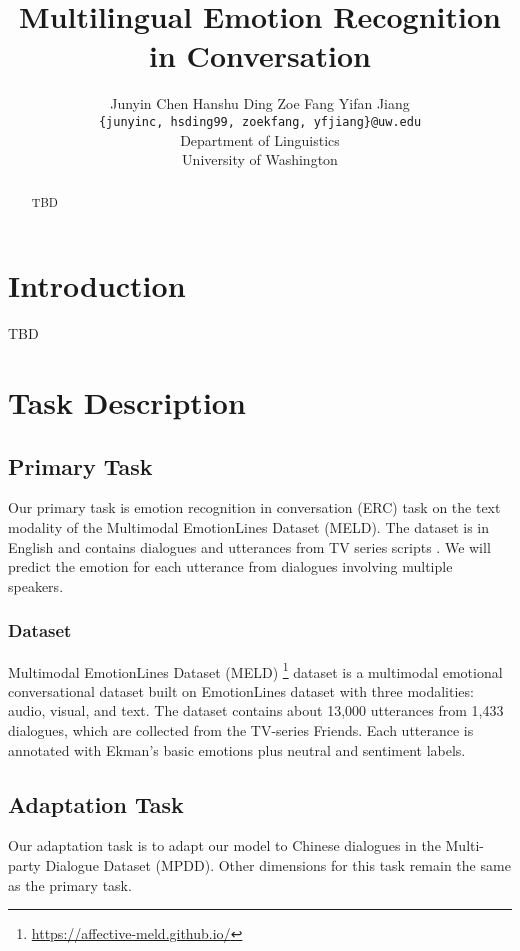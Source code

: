 \documentclass[11pt]{article}
\title{Multilingual Emotion Recognition in Conversation}
\author{Junyin Chen {} {} {} Hanshu Ding {} {} {} Zoe Fang {} {} {} Yifan Jiang \\
		\texttt{\{junyinc, hsding99, zoekfang, yfjiang\}@uw.edu} \\
        Department of Linguistics \\ University of Washington}
\begin{document}
\maketitle
\begin{abstract}
  TBD
\end{abstract}

\section{Introduction}
TBD

\section{Task Description}

\subsection{Primary Task}
\label{sect:primary_task}

Our primary task is emotion recognition in conversation (ERC) task on the text modality of the Multimodal EmotionLines Dataset (MELD). The dataset is in English and contains dialogues and utterances from TV series scripts . We will predict the emotion for each utterance from dialogues involving multiple speakers.

\subsubsection{Dataset}

Multimodal EmotionLines Dataset (MELD) \citep{poria-etal-2019-meld} \footnote{\url{https://affective-meld.github.io/}} dataset is a multimodal emotional conversational dataset built on EmotionLines dataset \citep{hsu-etal-2018-emotionlines} with three modalities: audio, visual, and text. The dataset contains about 13,000 utterances from 1,433 dialogues, which are collected from the TV-series Friends. Each utterance is annotated with Ekman's basic emotions plus neutral and sentiment labels.

\subsection{Adaptation Task}
\label{sect:adaptation_task}

Our adaptation task is to adapt our model to Chinese dialogues in the Multi-party Dialogue Dataset (MPDD). Other dimensions for this task remain the same as the primary task.
\end{document}
